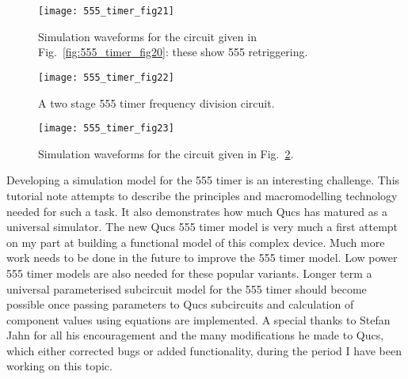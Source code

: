 \FloatBarrier
\begin{figure}[ht]
  \centering
  \texttt{[image: 555\_timer\_fig21]}
  \caption{Simulation waveforms for the circuit given in Fig.~\ref{fig:555_timer_fig20}: these show 555 retriggering.}
  \label{fig:555_timer_fig21} 
\end{figure}  
\FloatBarrier 
\FloatBarrier 
\begin{figure}[ht]
  \centering
  \texttt{[image: 555\_timer\_fig22]} 
  \caption{A two stage 555 timer frequency division circuit.}
  \label{fig:555_timer_fig22}  
\end{figure} 
\FloatBarrier

\FloatBarrier
\begin{figure}[ht]
  \centering 
  \texttt{[image: 555\_timer\_fig23]} 
  \caption{Simulation waveforms for the circuit given in Fig.~\ref{fig:555_timer_fig22}.}
  \label{fig:555_timer_fig23}  
\end{figure} 
\FloatBarrier

Developing a simulation model for the 555 timer is an interesting challenge. This tutorial note attempts to describe the principles and macromodelling technology needed for such a task. It also demonstrates how much Qucs has matured as a universal simulator. The new Qucs 555 timer model is very much a first attempt on my part at building a functional model of this complex device.  Much more work needs to be done in the future to improve the 555 timer model. Low power 555 timer models are also needed for these popular variants.  Longer term a universal parameterised subcircuit model for the 555 timer should become possible once passing parameters to Qucs subcircuits and calculation of component values using equations are implemented. A special thanks to Stefan Jahn for all his encouragement and the many modifications he made to Qucs, which either corrected bugs or added functionality, during the period I have been working on this topic. 
